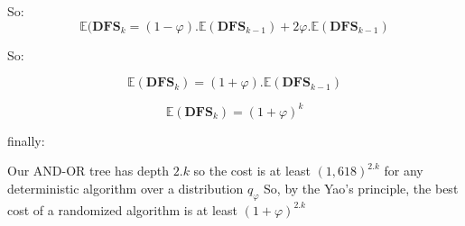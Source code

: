 So:
$$\mathbb{E}(\textbf{DFS}_{k}=(1-\varphi).\mathbb{E}(\textbf{DFS}_{k-1})+2\varphi.\mathbb{E}(\textbf{DFS}_{k-1})$$

So:

$$\mathbb{E}(\textbf{DFS}_{k})=(1+\varphi).\mathbb{E}(\textbf{DFS}_{k-1})$$

$$\mathbb{E}(\textbf{DFS}_{k})=(1+\varphi)^{k}$$

finally:

Our AND-OR tree has depth $2.k$ so the cost is at least $(1,618)^{2.k}$ for any deterministic algorithm over a distribution $q_{\varphi}$
So, by the Yao's principle, the best cost of a randomized algorithm is at least $(1+\varphi)^{2.k}$

\flushright{$\square$}
\flushleft

